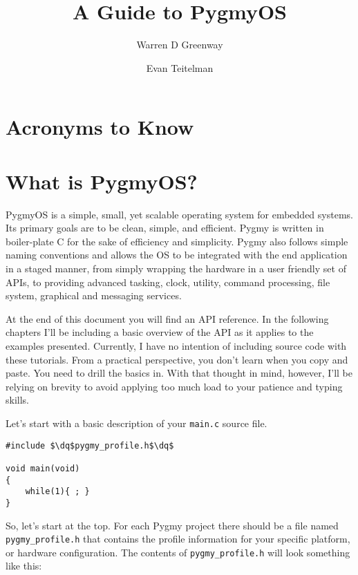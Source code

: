 \documentclass{article}
\newcommand{\dq}{\textquotedbl}
\begin{document}
\title{A Guide to PygmyOS}
\author{Warren D Greenway \and Evan Teitelman}
\maketitle

\tableofcontents

\section{Acronyms to Know}
\begin{acronym}
\end{acronym}

\section{What is PygmyOS?}
PygmyOS is a simple, small, yet scalable operating system for embedded systems. Its primary goals are to be clean, simple, and efficient. Pygmy is written in boiler-plate C for the sake of efficiency and simplicity. Pygmy also follows simple naming conventions and allows the OS to be integrated with the end application in a staged manner, from simply wrapping the hardware in a user friendly set of APIs, to providing advanced tasking, clock, utility, command processing, file system, graphical and messaging services.

At the end of this document you will find an API reference. In the following chapters I'll be including a basic overview of the API as it applies to the examples presented. Currently, I have no intention of including source code with these tutorials. From a practical perspective, you don't learn when you copy and paste. You need to drill the basics in. With that thought in mind, however, I'll be relying on brevity to avoid applying too much load to your patience and typing skills.

Let's start with a basic description of your \verb|main.c| source file.

\begin{lstlisting}
#include $\dq$pygmy_profile.h$\dq$

void main(void)
{
	while(1){ ; }
}
\end{lstlisting}

So, let's start at the top. For each Pygmy project there should be a file named \verb|pygmy_profile.h| that contains the profile information for your specific platform, or hardware configuration. The contents of \verb|pygmy_profile.h| will look something like this:
\end{document}
